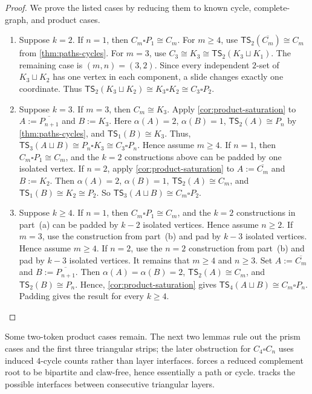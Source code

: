 \documentclass[a4paper]{article}
\theoremstyle{plain}
\theoremstyle{definition}
\newcommand{\TSsym}{\mathsf{TS}}
\numberwithin{equation}{section}
\begin{document}
\begin{proof}
We prove the listed cases by reducing them to known cycle, complete-graph, and product cases.
\begin{enumerate}[label=\textup{(\alph*)},leftmargin=2em]
\item Suppose $k=2$.
If $n=1$, then $C_m\square P_1\cong C_m$.
For $m\ge 4$, use $\TSsym_2(\overline{C_m})\cong C_m$ from \cref{thm:paths-cycles}.
For $m=3$, use $C_3\cong K_3\cong \TSsym_2(K_3\sqcup K_1)$.
The remaining case is $(m,n)=(3,2)$.
Since every independent $2$-set of $K_3\sqcup K_2$ has one vertex in each component, a slide changes exactly one coordinate.
Thus $\TSsym_2(K_3\sqcup K_2)\cong K_3\square K_2\cong C_3\square P_2$.

\item Suppose $k=3$.
If $m=3$, then $C_m\cong K_3$.
Apply \cref{cor:product-saturation} to $A:=\overline{P_{n+1}}$ and $B:=K_3$.
Here $\alpha(A)=2$, $\alpha(B)=1$, $\TSsym_2(A)\cong P_n$ by \cref{thm:paths-cycles}, and $\TSsym_1(B)\cong K_3$.
Thus, $\TSsym_3(A\sqcup B)\cong P_n\square K_3\cong C_3\square P_n$.
Hence assume $m\ge 4$.
If $n=1$, then $C_m\square P_1\cong C_m$, and the $k=2$ constructions above can be padded by one isolated vertex.
If $n=2$, apply \cref{cor:product-saturation} to $A:=\overline{C_m}$ and $B:=K_2$.
Then $\alpha(A)=2$, $\alpha(B)=1$, $\TSsym_2(A)\cong C_m$, and $\TSsym_1(B)\cong K_2\cong P_2$.
So $\TSsym_3(A\sqcup B)\cong C_m\square P_2$.

\item Suppose $k\ge 4$.
If $n=1$, then $C_m\square P_1\cong C_m$, and the $k=2$ constructions in part~\textup{(a)} can be padded by $k-2$ isolated vertices.
Hence assume $n\ge 2$.
If $m=3$, use the construction from part~\textup{(b)} and pad by $k-3$ isolated vertices.
Hence assume $m\ge 4$.
If $n=2$, use the $n=2$ construction from part~\textup{(b)} and pad by $k-3$ isolated vertices.
It remains that $m\ge 4$ and $n\ge 3$.
Set $A:=\overline{C_m}$ and $B:=\overline{P_{n+1}}$.
Then $\alpha(A)=\alpha(B)=2$, $\TSsym_2(A)\cong C_m$, and $\TSsym_2(B)\cong P_n$.
Hence, \cref{cor:product-saturation} gives $\TSsym_4(A\sqcup B)\cong C_m\square P_n$.
Padding gives the result for every $k\ge 4$.
\end{enumerate}
\end{proof}

Some two-token product cases remain.
The next two lemmas rule out the prism cases and the first three triangular strips; the later obstruction for $C_4\square C_n$ uses induced $4$-cycle counts rather than layer interfaces.
 forces a reduced complement root to be bipartite and claw-free, hence essentially a path or cycle.
 tracks the possible interfaces between consecutive triangular layers.
\end{document}

